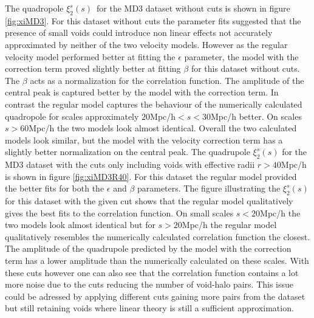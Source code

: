 The quadropole $\xi_2^s(s)$ for the MD3 dataset without cuts is shown in figure \ref{fig:xiMD3}. For this dataset without cuts the parameter fits suggested that the presence of small voids could introduce non linear effects not accurately approximated by neither of the two velocity models. However as the regular velocity model performed better at fitting the $\epsilon$ parameter, the model with the correction term proved slightly better at fitting $\beta$ for this dataset without cuts. The $\beta$ acts as a normalization for the correlation function. The amplitude of the central peak is captured better by the model with the correction term. In contrast the regular model captures the behaviour of the numerically calculated quadropole for scales approximately $20$Mpc/h$<s<30$Mpc/h better. On scales $s>60$Mpc/h the two models look almost identical. Overall the two calculated models look similar, but the model with the velocity correction term has a slightly better normalization on the central peak. The quadrupole $\xi_2^s(s)$ for the MD3 dataset with the cuts only including voids with effective radii $r>40$Mpc/h is shown in figure \ref{fig:xiMD3R40}. For this dataset the regular model provided the better fits for both the $\epsilon$ and $\beta$ parameters. The figure illustrating the $\xi_2^s(s)$ for this dataset with the given cut shows that the regular model qualitatively gives the best fits to the correlation function. On small scales $s<20$Mpc/h the two models look almost identical but for $s>20$Mpc/h the regular model qualitatively resembles the numerically calculated correlation function the closest. The amplitude of the quadrupole predicted by the model with the correction term has a lower amplitude than the numerically calculated on these scales. With these cuts however one can also see that the correlation function contains a lot more noise due to the cuts reducing the number of void-halo pairs. This issue could be adressed by applying different cuts gaining more pairs from the dataset but still retaining voids where linear theory is still a sufficient approximation.\\\indent
